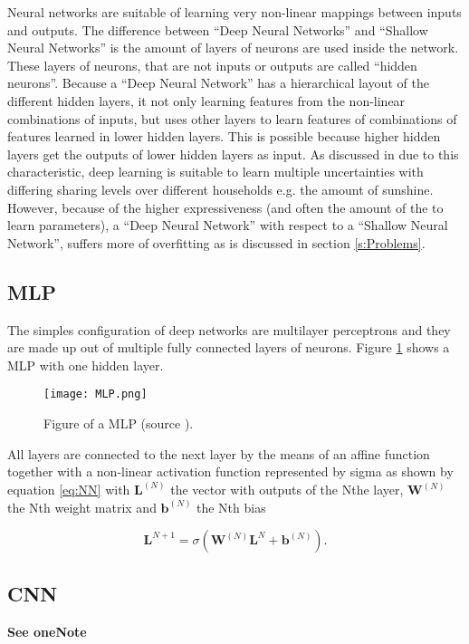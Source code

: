Neural networks are suitable of learning very non-linear mappings between inputs and outputs. The difference between ``Deep Neural Networks'' and ``Shallow Neural Networks'' is the amount of layers of neurons are used inside the network. These layers of neurons, that are not inputs or outputs are called ``hidden neurons''. Because a ``Deep Neural Network'' has a hierarchical layout of the different hidden layers, it not only learning features from the non-linear combinations of inputs, but uses other layers to learn features of combinations of features learned in lower hidden layers. This is possible because higher hidden layers get the outputs of lower hidden layers as input. As discussed in  \cite{Shi2018} due to this characteristic, deep learning is suitable to learn multiple uncertainties with differing sharing levels over different households e.g. the amount of sunshine. However, because of the higher expressiveness (and often the amount of the to learn parameters), a ``Deep Neural Network'' with respect to a ``Shallow Neural Network'', suffers more of overfitting as is discussed in section \ref{s:Problems}.

\subsection{MLP}
The simples configuration of deep networks are multilayer perceptrons and they are made up out of multiple fully connected layers of neurons. Figure \ref{fig:MLP} shows a MLP with one hidden layer.

\begin{figure}[h!]
	\centering
	\texttt{[image: MLP.png]}
	\caption{Figure of a MLP (source \cite{Czum2020}).}
	\label{fig:MLP}
\end{figure}

All layers are connected to the next layer by the means of an affine function together with a non-linear activation function represented by sigma as shown by equation \ref{eq:NN} with $ \textbf{L}^{(N)} $ the vector with outputs of the Nthe layer, $ \textbf{W}^(N) $ the Nth weight matrix and $ \textbf{b}^{(N)} $ the Nth bias


\begin{equation}\label{eq:NN}
	\textbf{L}^{N+1} = \sigma(\textbf{W}^{(N)}\textbf{L}^{N}+\textbf{b}^{(N)}).
\end{equation}


\subsection{CNN}
\textbf{See oneNote}


